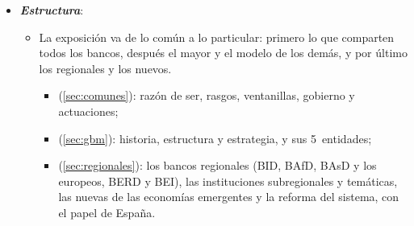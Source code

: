 \documentclass[11pt]{article}
\begin{document}
\begin{itemize}
\item \textbf{\emph{Estructura}}:
  \begin{itemize}
  \item La exposición va de lo común a lo particular: primero lo que comparten todos los bancos, después el mayor y el modelo de los demás, y por último los regionales y los nuevos.
    \begin{itemize}
    \item {} (\ref{sec:comunes}): razón de ser, rasgos, ventanillas, gobierno y actuaciones;
    \item {} (\ref{sec:gbm}): historia, estructura y estrategia, y sus 5~entidades;
    \item {} (\ref{sec:regionales}): los bancos regionales (BID, BAfD, BAsD y los europeos, BERD y BEI), las instituciones subregionales y temáticas, las nuevas de las economías emergentes y la reforma del sistema, con el papel de España.
    \end{itemize}
  \end{itemize}
\end{itemize}
\end{document}
